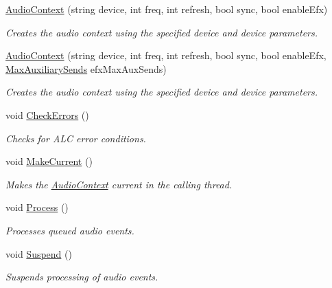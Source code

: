 \begin{DoxyCompactItemize}
\hyperlink{class_open_t_k_1_1_audio_1_1_audio_context_a13cbaaffb75b41a5c65d202d3659d02d}{Audio\-Context} (string device, int freq, int refresh, bool sync, bool enable\-Efx)
\begin{DoxyCompactList}\small\item\em Creates the audio context using the specified device and device parameters.\end{DoxyCompactList}\item 
\hyperlink{class_open_t_k_1_1_audio_1_1_audio_context_a0729f1d2e9eea3c8971bd1bbd547f435}{Audio\-Context} (string device, int freq, int refresh, bool sync, bool enable\-Efx, \hyperlink{class_open_t_k_1_1_audio_1_1_audio_context_a97c79a9ffc0910a0b644856cf82afdd8}{Max\-Auxiliary\-Sends} efx\-Max\-Aux\-Sends)
\begin{DoxyCompactList}\small\item\em Creates the audio context using the specified device and device parameters.\end{DoxyCompactList}\item 
void \hyperlink{class_open_t_k_1_1_audio_1_1_audio_context_ae7e4f34f10cfc77d771a7ca70df914ad}{Check\-Errors} ()
\begin{DoxyCompactList}\small\item\em Checks for A\-L\-C error conditions. \end{DoxyCompactList}\item 
void \hyperlink{class_open_t_k_1_1_audio_1_1_audio_context_a2ffa1096806ba6c55a9c15bca24e794a}{Make\-Current} ()
\begin{DoxyCompactList}\small\item\em Makes the \hyperlink{class_open_t_k_1_1_audio_1_1_audio_context}{Audio\-Context} current in the calling thread.\end{DoxyCompactList}\item 
void \hyperlink{class_open_t_k_1_1_audio_1_1_audio_context_af396e510f2039ee580a0d21a20304956}{Process} ()
\begin{DoxyCompactList}\small\item\em Processes queued audio events. \end{DoxyCompactList}\item 
void \hyperlink{class_open_t_k_1_1_audio_1_1_audio_context_a62417c8652bc1f7c22bf9a1cf83ed115}{Suspend} ()
\begin{DoxyCompactList}\small\item\em Suspends processing of audio events. \end{DoxyCompactList}\item 

\end{DoxyCompactItemize}
